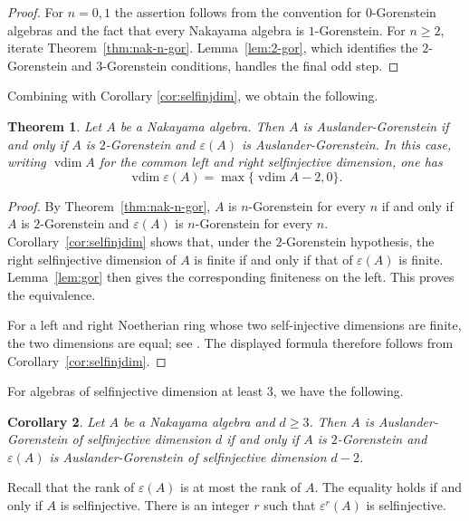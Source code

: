 \documentclass[a4paper,reqno]{amsart}
\numberwithin{equation}{section}
\theoremstyle{plain}
\newtheorem{thm}{Theorem}[section]
\newtheorem{cor}[thm]{Corollary}
\theoremstyle{definition}
\theoremstyle{remark}
\renewcommand{\-}{\mbox{-}}
\begin{document}
\begin{proof}
For $n=0,1$ the assertion follows from the convention for $0$-Gorenstein algebras
and the fact that every Nakayama algebra is $1$-Gorenstein. For $n\geq2$, iterate
Theorem~\ref{thm:nak-n-gor}. Lemma~\ref{lem:2-gor}, which identifies the
$2$-Gorenstein and $3$-Gorenstein conditions, handles the final odd step.
\end{proof}

Combining  with  Corollary \ref{cor:selfinjdim}, 
we obtain the following.

\begin{thm} \label{thm:nak-ausgor}
Let \(A\) be a Nakayama algebra.
Then \(A\) is Auslander-Gorenstein  if and only if 
\(A\) is \(2\)-Gorenstein and \(\varepsilon(A)\) is Auslander-Gorenstein.
In this case, writing $\operatorname{vdim}A$ for the common left and right
selfinjective dimension, one has
\begin{equation*}
    \operatorname{vdim}\varepsilon(A)=\max\{\operatorname{vdim}A-2,0\}.
\end{equation*}
\end{thm}


\begin{proof}
By Theorem~\ref{thm:nak-n-gor}, $A$ is $n$-Gorenstein for every $n$ if and only if
$A$ is $2$-Gorenstein and $\varepsilon(A)$ is $n$-Gorenstein for every $n$.
Corollary~\ref{cor:selfinjdim} shows that, under the $2$-Gorenstein hypothesis,
the right selfinjective dimension of $A$ is finite if and only if that of
$\varepsilon(A)$ is finite. Lemma~\ref{lem:gor} then gives the corresponding
finiteness on the left. This proves the equivalence.

For a left and right Noetherian ring whose two self-injective dimensions are finite,
the two dimensions are equal; see \cite{Zak69}. The displayed formula therefore
follows from Corollary~\ref{cor:selfinjdim}.
\end{proof}

For algebras of selfinjective dimension at least \(3\), we have the following.

\begin{cor} \label{prop:nak-d-ausgor}
Let \(A\) be a Nakayama algebra and \(d\geq 3\).
Then \(A\) is Auslander-Gorenstein of selfinjective dimension \(d\) if and only if 
\(A\) is \(2\)-Gorenstein and \(\varepsilon(A)\) is Auslander-Gorenstein of selfinjective dimension \(d-2\).
\end{cor}

Recall that the rank of \(\varepsilon(A)\) is at most the rank of \(A\).
The equality holds if and only if  \(A\) is selfinjective.
There is an integer \(r\) such that 
\(\varepsilon^r(A)\) is selfinjective.
\end{document}
